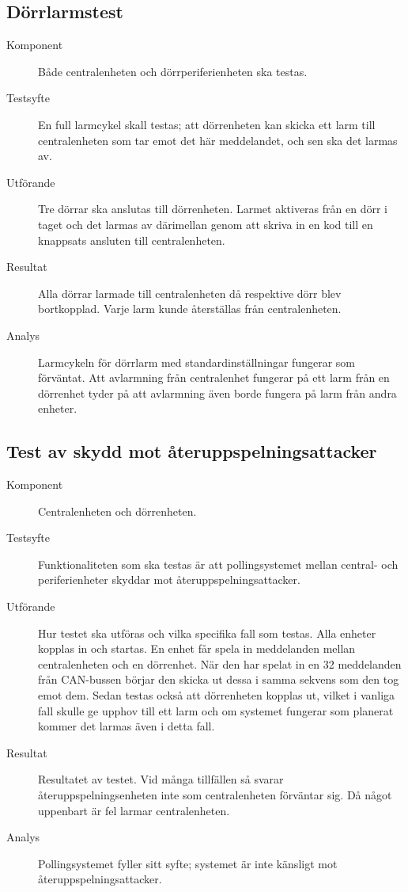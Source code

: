 \documentclass[a4paper]{article}
\begin{document}
\subsection{Dörrlarmstest}
\begin{description}
\item[Komponent] Både centralenheten och dörrperiferienheten ska testas.

\item[Testsyfte] En full larmcykel skall testas; att dörrenheten kan skicka ett larm till centralenheten som tar emot det här meddelandet, och sen ska det larmas av.

\item[Utförande] Tre dörrar ska anslutas till dörrenheten. Larmet aktiveras från en dörr i taget och det larmas av därimellan genom att skriva in en kod till en knappsats ansluten till centralenheten.

\item[Resultat] Alla dörrar larmade till centralenheten då respektive dörr blev bortkopplad. Varje larm kunde återställas från centralenheten.

\item[Analys] Larmcykeln för dörrlarm med standardinställningar fungerar som förväntat.
Att avlarmning från centralenhet fungerar på ett larm från en dörrenhet tyder på att avlarmning även borde fungera på larm från andra enheter.
\end{description}

\subsection{Test av skydd mot återuppspelningsattacker}
\begin{description}
\item[Komponent] Centralenheten och dörrenheten.

\item[Testsyfte] Funktionaliteten som ska testas är att pollingsystemet mellan central- och periferienheter skyddar mot återuppspelningsattacker.

\item[Utförande] Hur testet ska utföras och vilka specifika fall som testas.
Alla enheter kopplas in och startas.
En enhet får spela in meddelanden mellan centralenheten och en dörrenhet.
När den har spelat in en 32 meddelanden från CAN-bussen börjar den skicka ut dessa i samma sekvens som den tog emot dem.
Sedan testas också att dörrenheten kopplas ut, vilket i vanliga fall skulle ge upphov till ett larm och om systemet fungerar som planerat kommer det larmas även i detta fall.

\item[Resultat] Resultatet av testet. Vid många tillfällen så svarar återuppspelningsenheten inte som centralenheten förväntar sig.
Då något uppenbart är fel larmar centralenheten.

\item[Analys] Pollingsystemet fyller sitt syfte; systemet är inte känsligt mot återuppspelningsattacker.
\end{description}
\end{document}
